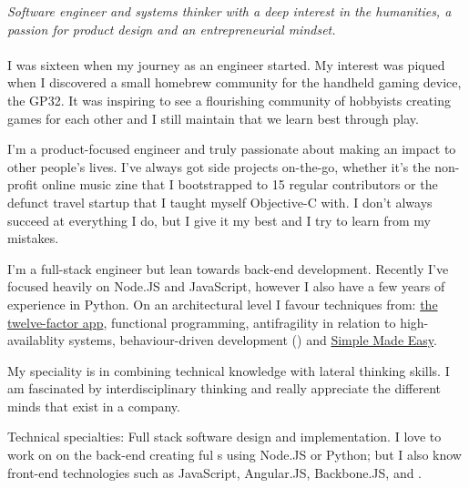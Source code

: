 \documentclass[10pt,a4paper]{article}
\begin{document}
\vspace{-1.3em}  %
\begin{multicols}{2}  %
\noindent \emph{Software engineer and systems thinker with a deep interest in the humanities, a passion for product design and an entrepreneurial mindset.}
\\
\\
I was sixteen when my journey as an engineer started. My interest was piqued when I discovered a small homebrew community for the handheld gaming device, the GP32. It was inspiring to see a flourishing community of hobbyists creating games for each other and I still maintain that we learn best through play.\newline

I'm a product-focused engineer and truly passionate about making an impact to other people's lives. I've always got side projects on-the-go, whether it's the non-profit online music zine that I bootstrapped to 15 regular contributors or the defunct travel startup that I taught myself Objective-C with. I don't always succeed at everything I do, but I give it my best and I try to learn from my mistakes.\newline

I'm a full-stack engineer but lean towards back-end development. Recently I've focused heavily on Node.JS and JavaScript, however I also have a few years of experience in Python. On an architectural level I favour techniques from: \href{http://12factor.net}{the twelve-factor app}, functional programming, antifragility in relation to high-availablity systems, behaviour-driven development () and \href{http://infoq.com/presentations/Simple-Made-Easy}{Simple Made Easy}.\newline

My speciality is in combining technical knowledge with lateral thinking skills. I am fascinated by interdisciplinary thinking and really appreciate the different minds that exist in a company.

\end{multicols}

\inlineheadsection  %
  {Technical specialties:}
  {Full stack software design and implementation. I love to work on on the back-end creating ful s using Node.JS or Python; but I also know front-end technologies such as JavaScript, Angular.JS, Backbone.JS,  and .}
\end{document}
